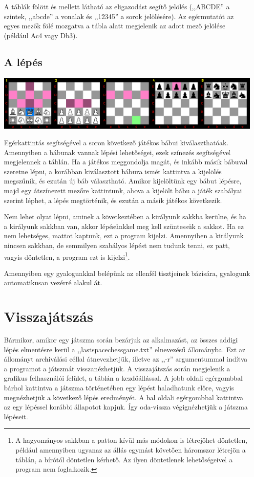 \documentclass[12pt, twoside]{report}
\begin{document}
A táblák fölött és mellett látható az eligazodást segítő jelölés (,,ABCDE'' a szintek, ,,abcde'' a vonalak és ,,12345'' a sorok jelölésére). Az egérmutatót az egyes mezők fölé mozgatva a tábla alatt megjelenik az adott mező jelölése (például Ac4 vagy Db3).

\subsection{A lépés}

\includegraphics[width=\textwidth]{SCScreenshotLin2}

Egérkattintás segítségével a soron következő játékos bábui kiválaszthatóak. Amennyiben a bábunak vannak lépési lehetőségei, ezek színezés segítségével megjelennek a táblán. Ha a játékos meggondolja magát, és inkább másik bábuval szeretne lépni, a korábban kiválasztott bábura ismét kattintva a kijelölés megszűnik, és ezután új báb választható. Amikor kijelöltünk egy bábut lépésre, majd egy átszínezett mezőre kattintunk, ahova a kijelölt bábu a játék szabályai szerint léphet, a lépés megtörténik, és ezután a másik játékos következik.

Nem lehet olyat lépni, aminek a következtében a királyunk sakkba kerülne, és ha a királyunk sakkban van, akkor lépésünkkel meg kell szüntessük a sakkot. Ha ez nem lehetséges, mattot kaptunk, ezt a program kijelzi. Amennyiben a királyunk nincsen sakkban, de semmilyen szabályos lépést nem tudunk tenni, ez patt, vagyis döntetlen, a program ezt is kijelzi\footnote{A hagyományos sakkban a patton kívül más módokon is létrejöhet döntetlen, például amennyiben ugyanaz az állás egymást követően háromszor létrejön a táblán, a bírótól döntetlen kérhető. Az ilyen döntetlenek lehetőségeivel a program nem foglalkozik.}.

Amennyiben egy gyalogunkkal belépünk az ellenfél tisztjeinek bázisára, gyalogunk automatikusan vezérré alakul át.

\section{Visszajátszás}

Bármikor, amikor egy játszma során bezárjuk az alkalmazást, az összes addigi lépés elmentésre kerül a ,,lastspacechessgame.txt'' elnevezésű állományba. Ezt az állományt archiválási céllal átnevezhetjük, illetve az ,,-r'' argumentummal indítva a programot a játszmát visszanézhetjük. A visszajátszás során megjelenik a grafikus felhasználói felület, a táblán a kezdőállással. A jobb oldali egérgombbal bárhol kattintva a játszma történetében egy lépést haladhatunk előre, vagyis megnézhetjük a következő lépés eredményét. A bal oldali egérgombbal kattintva az egy lépéssel korábbi állapotot kapjuk. Így oda-vissza végignézhetjük a játszma lépéseit.
\end{document}
